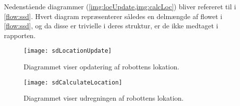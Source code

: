 Nedenstående diagrammer (\cref{img:locUpdate,img:calcLoc}) bliver refereret til i \cref{flow:ssd}.
Hvert diagram repræsenterer således en delmængde af flowet i \cref{flow:ssd}, og da disse er trivielle i deres struktur, er de ikke medtaget i rapporten.

\begin{figure}[H]
\centering \texttt{[image: sdLocationUpdate]}
\caption{Diagrammet viser opdatering af robottens lokation.}
\label{img:locUpdate}
\end{figure} 

\begin{figure}[H]
\centering \texttt{[image: sdCalculateLocation]}
\caption{Diagrammet viser udregningen af robottens lokation.}
\label{img:calcLoc}
\end{figure}
	